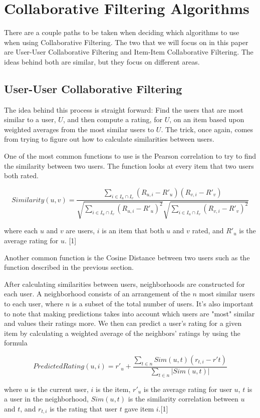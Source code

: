 \documentclass[11pt,reqno]{amsart}
\theoremstyle{definition}
\numberwithin{equation}{subsection}
\begin{document}
\section{Collaborative Filtering Algorithms}
There are a couple paths to be taken when deciding which algorithms to use when using Collaborative Filtering. The two that we will focus on in this paper are User-User Collaborative Filtering and Item-Item Collaborative Filtering. The ideas behind both are similar, but they focus on different areas. 

\subsection{User-User Collaborative Filtering}
The idea behind this process is straight forward: Find the users that are most similar to a user, $U$, and then compute a rating, for $U$, on an item based upon weighted averages from the most similar users to $U$. The trick, once again, comes from trying to figure out how to calculate similarities between users. 

One of the most common functions to use is the Pearson correlation to try to find the similarity between two users. The function looks at every item that two users both rated.

\[
	Similarity(u,v) = \frac{\sum_{i \in I_u \cap I_v} (R_{u,i} - R'_u)(R_{v,i} - R'_v)}{ \sqrt{\sum_{i \in I_u \cap I_v}(R_{u,i} - R'_u)^2} \sqrt{\sum_{i \in I_u \cap I_v}(R_{v,i} - R'_v)^2}}
\]

where each $u$ and $v$ are users, $i$ is an item that both $u$ and $v$ rated, and $R'_u$ is the average rating for $u$. [1]

Another common function is the Cosine Distance between two users such as the function described in the previous section.

After calculating similarities between users, neighborhoods are constructed for each user. A neighborhood consists of an arrangement of the $n$ most similar users to each user, where $n$ is a subset of the total number of users. It's also important to note that making predictions takes into account which users are "most" similar and values their ratings more. We then can predict a user's rating for a given item by calculating a weighted average of the neighbors' ratings by using the formula

\[
	PredictedRating(u,i) = r'_u + \frac{\sum_{t \in n} Sim(u,t)(r_{t,i} - r'{t})}{\sum_{t \in n} |Sim(u,t)|}
\]

where $u$ is the current user, $i$ is the item, $r'_{u}$ is the average rating for user $u$, $t$ is a user in the neighborhood, $Sim(u,t)$ is the similarity correlation between $u$ and $t$, and $r_{t,i}$ is the rating that user $t$ gave item $i$.[1]
\end{document}
